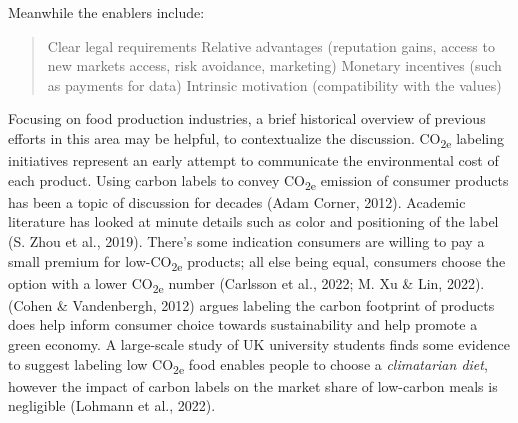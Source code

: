 \documentclass[
  12pt,
  letterpaper,
  DIV=11,
  numbers=noendperiod]{scrartcl}
\begin{document}
Meanwhile the enablers include:

\begin{quote}
Clear legal requirements Relative advantages (reputation gains, access
to new markets access, risk avoidance, marketing) Monetary incentives
(such as payments for data) Intrinsic motivation (compatibility with the
values)
\end{quote}

Focusing on food production industries, a brief historical overview of
previous efforts in this area may be helpful, to contextualize the
discussion. CO\textsubscript{2e} labeling initiatives represent an early
attempt to communicate the environmental cost of each product. Using
carbon labels to convey CO\textsubscript{2e} emission of consumer
products has been a topic of discussion for decades (Adam Corner, 2012).
Academic literature has looked at minute details such as color and
positioning of the label (S. Zhou et al., 2019). There's some indication
consumers are willing to pay a small premium for
low-CO\textsubscript{2e} products; all else being equal, consumers
choose the option with a lower CO\textsubscript{2e} number (Carlsson et
al., 2022; M. Xu \& Lin, 2022). (Cohen \& Vandenbergh, 2012) argues
labeling the carbon footprint of products does help inform consumer
choice towards sustainability and help promote a green economy. A
large-scale study of UK university students finds some evidence to
suggest labeling low CO\textsubscript{2e} food enables people to choose
a \emph{climatarian diet}, however the impact of carbon labels on the
market share of low-carbon meals is negligible (Lohmann et al., 2022).
\end{document}

